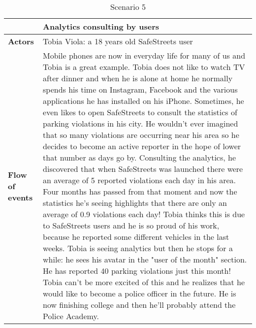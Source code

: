 \begin{table}[!htbp]
	\centering
\begin{tabular}{lp{9cm}}
\hline
\bf\large  &\bf\large Analytics consulting by users\\
\hline
\hline

\bf Actors&Tobia Viola: a 18 years old SafeStreets user\\
\hline
\bf Flow of events&
Mobile phones are now in everyday life for many of us and Tobia is a great example. Tobia does not like to watch TV after dinner and when he is alone at home he normally spends his time on Instagram, Facebook and the various applications he has installed on his iPhone.
Sometimes, he even likes to open SafeStreets to consult the statistics of parking violations in his city.
He wouldn't ever imagined that so many violations are occurring near his area so he decides to become an active reporter in the hope of lower that number as days go by.
Consulting the analytics, he discovered that when SafeStreets was launched there were an average of 5 reported violations each day in his area.
Four months has passed from that moment and now the statistics he's seeing highlights that there are only an average of 0.9 violations each day! 
Tobia thinks this is due to SafeStreets users and he is so proud of his work, because he reported some different vehicles in the last weeks.
Tobia is seeing analytics but then he stops for a while:  he sees his avatar in the "user of the month" section. He has reported 40 parking violations just this month!
Tobia can't be more excited of this and he realizes that he would like to become a police officer in the future.
He is now finishing college and then he'll probably attend the Police Academy.
\end{tabular}
\caption{Scenario 5} 
\label{tab:scenariofive}
\end{table}